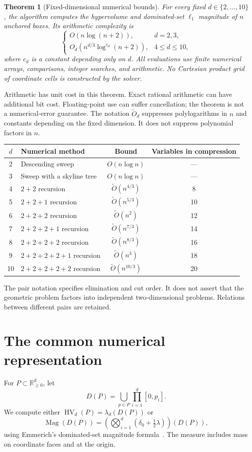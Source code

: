 \documentclass[12pt,a4paper]{article}
\newtheorem{theorem}{Theorem}
\newcommand{\HV}{\operatorname{HV}}
\newcommand{\Mag}{\operatorname{Mag}}
\newcommand{\wtO}{\widetilde O}
\newcommand{\1}{\mathbf1}
\begin{document}
\begin{theorem}[Fixed-dimensional numerical bounds]\label{thm:main}
For every fixed $d\in\{2,\ldots,10\}$, the algorithm computes the
hypervolume and dominated-set $\ell_1$ magnitude of $n$ anchored boxes.
Its arithmetic complexity is
\[
\begin{cases}
O(n\log(n+2)),&d=2,3,\\
O_d(n^{d/3}\log^{c_d}(n+2)),&4\le d\le10,
\end{cases}
\]
where $c_d$ is a constant depending only on $d$. All evaluations use finite
numerical arrays, comparisons, integer searches, and arithmetic. No
Cartesian product grid of coordinate cells is constructed by the solver.
\end{theorem}
Arithmetic has unit cost in this theorem. Exact rational arithmetic can
have additional bit cost. Floating-point use can suffer cancellation;
the theorem is not a numerical-error guarantee. The notation $\wtO_d$
suppresses polylogarithms in $n$ and constants depending on the fixed
dimension. It does not suppress polynomial factors in $n$.

\begin{center}
\begin{tabular}{@{}clcc@{}}
\toprule
$d$&Numerical method&Bound&Variables in compression\\\midrule
2&Descending sweep&$O(n\log n)$&---\\
3&Sweep with a skyline tree&$O(n\log n)$&---\\
4&$2+2$ recursion&$\wtO(n^{4/3})$&8\\
5&$2+2+1$ recursion&$\wtO(n^{5/3})$&10\\
6&$2+2+2$ recursion&$\wtO(n^2)$&12\\
7&$2+2+2+1$ recursion&$\wtO(n^{7/3})$&14\\
8&$2+2+2+2$ recursion&$\wtO(n^{8/3})$&16\\
9&$2+2+2+2+1$ recursion&$\wtO(n^3)$&18\\
10&$2+2+2+2+2$ recursion&$\wtO(n^{10/3})$&20\\
\bottomrule
\end{tabular}
\end{center}
The pair notation specifies elimination and cut order. It does not assert
that the geometric problem factors into independent two-dimensional
problems. Relations between different pairs are retained.

\section{The common numerical representation}
For $P\subset\mathbb R_{\ge0}^d$, let
\[
D(P)=\bigcup_{p\in P}\prod_{i=1}^d[0,p_i].
\]
We compute either $\HV_d(P)=\lambda_d(D(P))$ or
\[
\Mag(D(P))=\left(\bigotimes_{i=1}^d
           (\delta_0+\tfrac12\lambda)\right)(D(P)),
\]
using Emmerich's dominated-set magnitude formula~\cite{emmerich}.
The measure includes mass on coordinate faces and at the origin.
\end{document}
